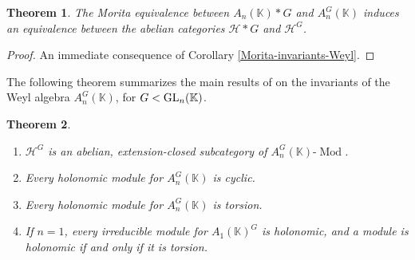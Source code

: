 \documentclass[12pt, a4paper]{amsart}
\newtheorem{theorem}{Theorem}[section]
\newcommand{\Weyl}{A_n(\mathbb{K})} %
\newcommand{\Invar}{A_n^G(\mathbb{K})}           %
\def\k{\mathbb K}
\newcommand{\GL}{{\rm{GL}}}
\def\k{\mathbb K}
\def\KK{\mathbb K}
\def\H{\mathcal H}
\begin{document}
\begin{theorem}
    The Morita equivalence between $\Weyl*G$ and $\Invar$ induces an equivalence between the abelian categories $\H*G$ and $\H^G$.
\end{theorem}
\begin{proof}
    An immediate consequence of Corollary \ref{Morita-invariants-Weyl}.
\end{proof}
The following theorem summarizes the main results of \cite{FS4} on the invariants of the Weyl algebra $\Invar$, for $G < \GL_n(\k)$.
\begin{theorem}\label{main-properties-holonomic-modules}
    \begin{enumerate}
\item $\H^G$ is an abelian, extension-closed subcategory of $\Invar\text{-}\operatorname{Mod}$.
\item Every holonomic module for $\Invar$ is cyclic.
\item Every holonomic module for $\Invar$ is torsion.
\item If $n=1$, every irreducible module for $A_1(\KK)^G$ is holonomic, and a module is holonomic if and only if it is torsion.
\end{enumerate}
\end{theorem}
\end{document}
